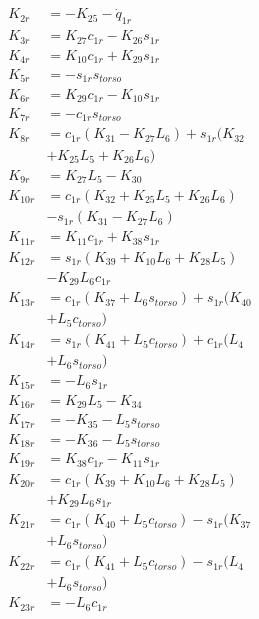\begin{multicols}{2}
\begin{align}
K_{2r} &= - K_{25} - \dot{q}_{1r} \nonumber \\
K_{3r} &= K_{27}c_{1r} - K_{26}s_{1r} \nonumber \\
K_{4r} &= K_{10}c_{1r} + K_{29}s_{1r} \nonumber \\
K_{5r} &= -s_{1r}s_{torso} \nonumber \\
K_{6r} &= K_{29}c_{1r} - K_{10}s_{1r} \nonumber \\
K_{7r} &= -c_{1r}s_{torso} \nonumber \\
K_{8r} &= c_{1r}(K_{31} - K_{27}L_6) + s_{1r}(K_{32}  \nonumber \\
&+ K_{25}L_5 + K_{26}L_6) \nonumber \\
K_{9r} &= K_{27}L_5 - K_{30} \nonumber \\
K_{10r} &= c_{1r}(K_{32} + K_{25}L_5 + K_{26}L_6)  \nonumber \\
&- s_{1r}(K_{31} - K_{27}L_6) \nonumber \\
K_{11r} &= K_{11}c_{1r} + K_{38}s_{1r} \nonumber \\
K_{12r} &= s_{1r}(K_{39} + K_{10}L_6 + K_{28}L_5)  \nonumber \\
&- K_{29}L_6c_{1r} \nonumber \\
K_{13r} &= c_{1r}(K_{37} + L_6s_{torso}) + s_{1r}(K_{40}  \nonumber \\
&+ L_5c_{torso}) \nonumber \\
K_{14r} &= s_{1r}(K_{41} + L_5c_{torso}) + c_{1r}(L_4  \nonumber \\
&+ L_6s_{torso}) \nonumber \\
K_{15r} &= -L_6s_{1r} \nonumber \\
K_{16r} &= K_{29}L_5 - K_{34} \nonumber \\
K_{17r} &= - K_{35} - L_5s_{torso} \nonumber \\
K_{18r} &= - K_{36} - L_5s_{torso} \nonumber \\
K_{19r} &= K_{38}c_{1r} - K_{11}s_{1r} \nonumber \\
K_{20r} &= c_{1r}(K_{39} + K_{10}L_6 + K_{28}L_5)  \nonumber \\
&+ K_{29}L_6s_{1r} \nonumber \\
K_{21r} &= c_{1r}(K_{40} + L_5c_{torso}) - s_{1r}(K_{37}  \nonumber \\
&+ L_6s_{torso}) \nonumber \\
K_{22r} &= c_{1r}(K_{41} + L_5c_{torso}) - s_{1r}(L_4  \nonumber \\
&+ L_6s_{torso}) \nonumber \\
K_{23r} &= -L_6c_{1r} \nonumber \\

\end{align}
\end{multicols}
